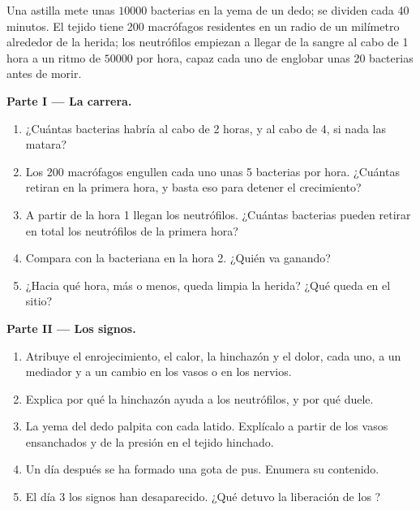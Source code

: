 \begin{problem}
\label{pb:g12:innate-immunity:1}
Una astilla mete unas $\num{10000}$ bacterias en la yema de un dedo;
se dividen cada 40 minutos. El tejido tiene 200 macrófagos residentes
en un radio de un milímetro alrededor de la herida; los neutrófilos
empiezan a llegar de la sangre al cabo de 1 hora a un ritmo de
$\num{50000}$ por hora, capaz cada uno de englobar unas 20 bacterias
antes de morir.

\medskip
\noindent\textbf{Parte I --- La carrera.}
\begin{enumerate}
  \item ¿Cuántas bacterias habría al cabo de 2 horas, y al cabo de 4,
        si nada las matara?
  \item Los 200 macrófagos engullen cada uno unas 5 bacterias por hora.
        ¿Cuántas retiran en la primera hora, y basta eso para detener
        el crecimiento?
  \item A partir de la hora 1 llegan los neutrófilos. ¿Cuántas
        bacterias pueden retirar en total los neutrófilos de la primera
        hora?
  \item Compara con la  bacteriana en la hora 2. ¿Quién va
        ganando?
  \item ¿Hacia qué hora, más o menos, queda limpia la herida? ¿Qué
        queda en el sitio?
\end{enumerate}

\medskip
\noindent\textbf{Parte II --- Los signos.}
\begin{enumerate}[resume]
  \item Atribuye el enrojecimiento, el calor, la hinchazón y el dolor,
        cada uno, a un mediador y a un cambio en los vasos o en los
        nervios.
  \item Explica por qué la hinchazón ayuda a los neutrófilos, y por qué
        duele.
  \item La yema del dedo palpita con cada latido. Explícalo a partir de
        los vasos ensanchados y de la presión en el tejido hinchado.
  \item Un día después se ha formado una gota de pus. Enumera su
        contenido.
  \item El día 3 los signos han desaparecido. ¿Qué detuvo la liberación
        de los ?
\end{enumerate}


\end{problem}
